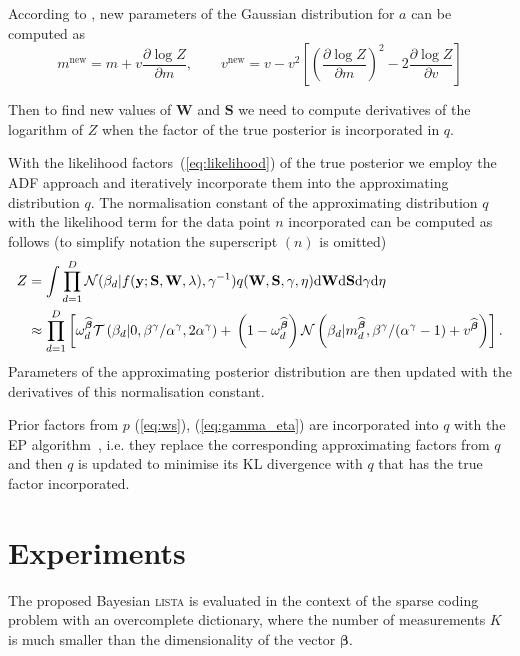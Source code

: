 \documentclass{article}
\begin{document}
According to \cite{minka2001thesis}, new parameters of the Gaussian distribution for $a$ can be computed as
\begin{equation}
m^{\text{new}} = m + v \frac{\partial \log Z}{\partial m}, \qquad
v^{\text{new}} = v - v^2\left[ \left(\frac{\partial \log Z}{\partial m}\right)^2 - 2 \frac{\partial \log Z}{\partial v}\right]
\end{equation}

Then to find new values of $\mathbf{W}$ and $\mathbf{S}$ we need to compute derivatives of the logarithm of $Z$ when the factor of the true posterior is incorporated in $q$.

With the likelihood factors~(\ref{eq:likelihood}) of the true posterior we employ the ADF approach and iteratively incorporate them into the approximating distribution $q$. The normalisation constant of the approximating distribution $q$ with the likelihood term for the data point $n$ incorporated can be computed as follows (to simplify notation the superscript $(n)$ is omitted)
\begin{align}
Z & = \int \prod_{d=1}^{D} \mathcal{N}(\beta_d | f(\mathbf{y} ; \mathbf{S}, \mathbf{W}, \lambda), \gamma^{-1}) q(\mathbf{W}, \mathbf{S}, \gamma, \eta) \mathrm{d}\mathbf{W} \mathrm{d}\mathbf{S} \mathrm{d}\gamma \mathrm{d}\eta \nonumber\\
\label{eq:Z}
& \approx \prod_{d=1}^D \left[\omega^{\widehat{\boldsymbol\beta}}_d  \mathcal{T}\left(\beta_d | 0, \beta^\gamma / \alpha^\gamma, 2\alpha^\gamma\right) + \vphantom{m^{\widehat{\boldsymbol\beta}}_d} \left(1 - \omega^{\widehat{\boldsymbol\beta}}_d\right)\mathcal{N}\left(\beta_d | m^{\widehat{\boldsymbol\beta}}_d,  \beta^\gamma / (\alpha^\gamma - 1) + v^{\widehat{\boldsymbol\beta}}\right)\right].
\end{align}
Parameters of the approximating posterior distribution are then updated with the derivatives of this normalisation constant.

Prior factors from $p$ (\ref{eq:ws}), (\ref{eq:gamma_eta}) are incorporated into $q$ with the EP algorithm~\citep{hernandez2015probabilistic}, i.e. they replace the corresponding approximating factors from $q$ and then $q$ is updated to minimise its KL divergence with $q$ that has the true factor incorporated.

\section{Experiments}
\label{sec:experiments}
The proposed Bayesian \textsc{lista} is evaluated in the context of the sparse coding problem with an overcomplete dictionary, where the number of measurements $K$ is much smaller than the dimensionality of the vector $\boldsymbol\beta$.
\end{document}

